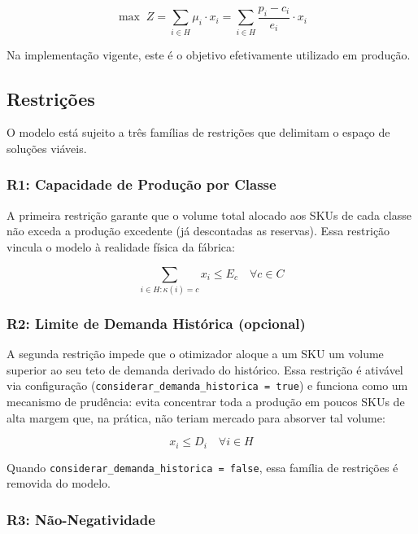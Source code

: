 \documentclass[11pt,a4paper]{article}
\begin{document}
\begin{equation}\label{eq:auto:023}
\max \; Z = \sum_{i \in H} \mu_i \cdot x_i = \sum_{i \in H} \frac{p_i - c_i}{e_i} \cdot x_i
\end{equation}

Na implementação vigente, este é o objetivo efetivamente utilizado em produção.

\subsection{Restrições}

O modelo está sujeito a três famílias de restrições que delimitam o espaço de
soluções viáveis.

\subsubsection{R1: Capacidade de Produção por Classe}

A primeira restrição garante que o volume total alocado aos SKUs de cada classe
não exceda a produção excedente (já descontadas as reservas). Essa restrição
vincula o modelo à realidade física da fábrica:

\begin{equation}\label{eq:auto:024}
\sum_{i \in H : \kappa(i) = c} x_i \leq E_c \quad \forall c \in C
\end{equation}

\subsubsection{R2: Limite de Demanda Histórica (opcional)}

A segunda restrição impede que o otimizador aloque a um SKU um volume superior
ao seu teto de demanda derivado do histórico. Essa restrição é ativável via
configuração (\texttt{considerar\_demanda\_historica = true}) e funciona como um
mecanismo de prudência: evita concentrar toda a produção em poucos SKUs de alta
margem que, na prática, não teriam mercado para absorver tal volume:

\begin{equation}\label{eq:auto:025}
x_i \leq D_i \quad \forall i \in H
\end{equation}

Quando \texttt{considerar\_demanda\_historica = false}, essa família de
restrições é removida do modelo.

\subsubsection{R3: Não-Negatividade}
\end{document}
